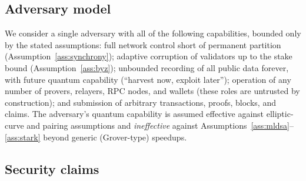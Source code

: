 \documentclass[11pt]{article}
\theoremstyle{plain}
\theoremstyle{definition}
\theoremstyle{remark}
\begin{document}
\subsection{Adversary model}

We consider a single adversary with all of the following capabilities,
bounded only by the stated assumptions: full network control short of
permanent partition (Assumption~\ref{ass:synchrony}); adaptive corruption of
validators up to the stake bound (Assumption~\ref{ass:byz}); unbounded
recording of all public data forever, with future quantum capability
(``harvest now, exploit later''); operation of any number of provers,
relayers, RPC nodes, and wallets (these roles are untrusted by
construction); and submission of arbitrary transactions, proofs, blocks, and
claims. The adversary's quantum capability is assumed effective against
elliptic-curve and pairing assumptions and \emph{ineffective} against
Assumptions~\ref{ass:mldsa}--\ref{ass:stark} beyond generic (Grover-type)
speedups.

\subsection{Security claims}
\end{document}
